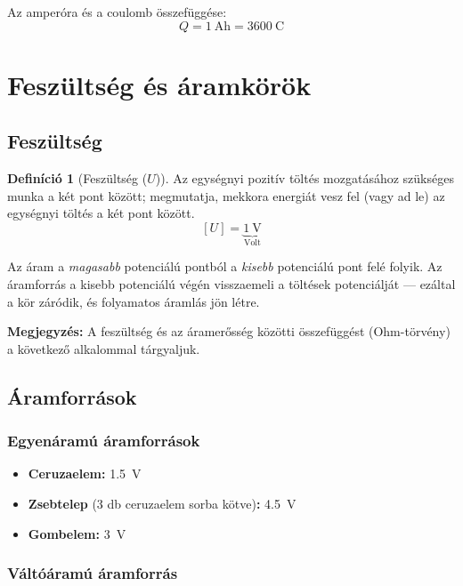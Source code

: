 \documentclass{article}
\theoremstyle{definition}
\newtheorem{definition}{Definíció}
\begin{document}
Az amperóra és a coulomb összefüggése:
\[
    Q = \SI{1}{\ampere\hour} = \SI{3600}{\coulomb}
\]

\section{Feszültség és áramkörök}

\subsection{Feszültség}

\begin{definition}[Feszültség ($U$)]
    Az egységnyi pozitív töltés mozgatásához szükséges munka a két pont
    között; megmutatja, mekkora energiát vesz fel (vagy ad le) az
    egységnyi töltés a két pont között.
    \[
        [U] = \underbrace{\SI{1}{\volt}}_{\text{Volt}}
    \]
\end{definition}

Az áram a \emph{magasabb} potenciálú pontból a \emph{kisebb} potenciálú
pont felé folyik. Az áramforrás a kisebb potenciálú végén visszaemeli a
töltések potenciálját — ezáltal a kör záródik, és folyamatos áramlás jön
létre.

\medskip
\noindent\textbf{Megjegyzés:} A feszültség és az áramerősség közötti
összefüggést (Ohm-törvény) a következő alkalommal tárgyaljuk.

\subsection{Áramforrások}

\subsubsection{Egyenáramú áramforrások}

\begin{itemize}
    \item \textbf{Ceruzaelem:} \SI{1.5}{\volt}
    \item \textbf{Zsebtelep} (3 db ceruzaelem sorba kötve)\textbf{:}
          \SI{4.5}{\volt}
    \item \textbf{Gombelem:} \SI{3}{\volt}
\end{itemize}

\subsubsection{Váltóáramú áramforrás}
\end{document}

